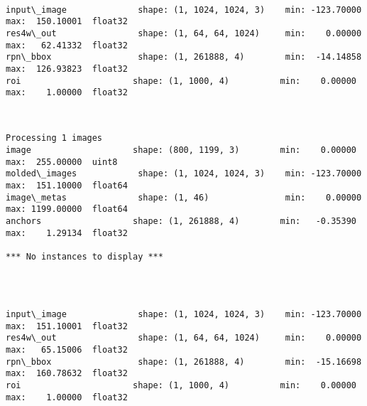 \documentclass[11pt]{article}
\begin{document}
    \begin{center}
    \end{center}
    { \hspace*{\fill} \\}
    
    \begin{Verbatim}[commandchars=\\\{\}]
input\_image              shape: (1, 1024, 1024, 3)    min: -123.70000  max:  150.10001  float32
res4w\_out                shape: (1, 64, 64, 1024)     min:    0.00000  max:   62.41332  float32
rpn\_bbox                 shape: (1, 261888, 4)        min:  -14.14858  max:  126.93823  float32
roi                      shape: (1, 1000, 4)          min:    0.00000  max:    1.00000  float32

    \end{Verbatim}

    \begin{center}
    \end{center}
    { \hspace*{\fill} \\}
    
    \begin{Verbatim}[commandchars=\\\{\}]
Processing 1 images
image                    shape: (800, 1199, 3)        min:    0.00000  max:  255.00000  uint8
molded\_images            shape: (1, 1024, 1024, 3)    min: -123.70000  max:  151.10000  float64
image\_metas              shape: (1, 46)               min:    0.00000  max: 1199.00000  float64
anchors                  shape: (1, 261888, 4)        min:   -0.35390  max:    1.29134  float32

*** No instances to display *** 


    \end{Verbatim}

    \begin{center}
    \end{center}
    { \hspace*{\fill} \\}
    
    \begin{Verbatim}[commandchars=\\\{\}]
input\_image              shape: (1, 1024, 1024, 3)    min: -123.70000  max:  151.10001  float32
res4w\_out                shape: (1, 64, 64, 1024)     min:    0.00000  max:   65.15006  float32
rpn\_bbox                 shape: (1, 261888, 4)        min:  -15.16698  max:  160.78632  float32
roi                      shape: (1, 1000, 4)          min:    0.00000  max:    1.00000  float32

    \end{Verbatim}
\end{document}
